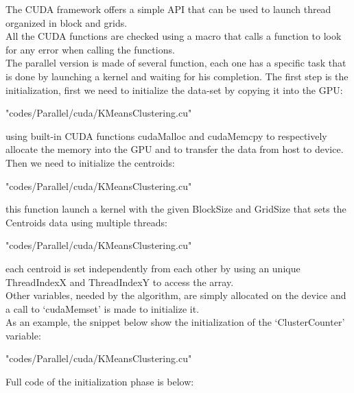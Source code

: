 \documentclass[10pt,twocolumn,letterpaper]{article}
\begin{document}
The CUDA framework offers a simple API that can be used to launch thread organized in block and grids.\\
All the CUDA functions are checked using a macro that calls a function to look for any error when calling the functions.\\
The parallel version is made of several function, each one has a specific task that is done by launching a kernel and waiting for his
completion.\newpage
The first step is the initialization, first we need to initialize the data-set by copying it into the GPU:\\
\begin{lstinputlisting}[language=C,style=CSnippetStyle,caption=CUDA Data-Set Initialization,firstline=244,lastline=254]{
	"codes/Parallel/cuda/KMeansClustering.cu"}
\end{lstinputlisting}
using built-in CUDA functions cudaMalloc and cudaMemcpy to respectively allocate the memory into the GPU and to transfer the data from
host to device.\\
Then we need to initialize the centroids:\\
\begin{lstinputlisting}[language=C,style=CSnippetStyle,caption=CUDA Centroids Initialization,firstline=186,lastline=203]{
	"codes/Parallel/cuda/KMeansClustering.cu"}
\end{lstinputlisting}
this function launch a kernel with the given BlockSize and GridSize that sets the Centroids data using multiple threads:\newpage
\begin{lstinputlisting}[language=C,style=CSnippetStyle,caption=CUDA Centroids Initialization,firstline=105,lastline=114]{
	"codes/Parallel/cuda/KMeansClustering.cu"}
\end{lstinputlisting}
each centroid is set independently from each other by using an unique ThreadIndexX and ThreadIndexY to access the array.\\
Other variables, needed by the algorithm, are simply allocated on the device and a call to `cudaMemset' is made to initialize it.\\
As an example, the snippet below show the initialization of the `ClusterCounter' variable:\\
\begin{lstinputlisting}[language=C,style=CSnippetStyle,caption=CUDA Example Initialization,firstline=207,lastline=219]{
	"codes/Parallel/cuda/KMeansClustering.cu"}
\end{lstinputlisting}
Full code of the initialization phase is below:\\
\end{document}
